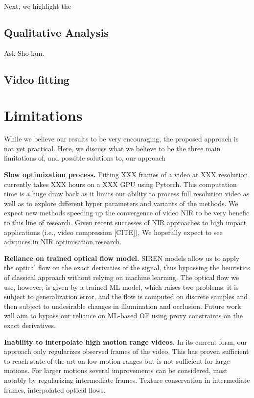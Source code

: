 \documentclass{article}
\begin{document}
Next, we highlight the



\subsection{Qualitative Analysis}

%
Ask Sho-kun.

\subsection{Video fitting}



\section{Limitations}

While we believe our results to be very encouraging, the proposed approach is not yet practical.
Here, we discuss what we believe to be the three main limitations of, and possible solutions to, our approach

\textbf{Slow optimization process.} Fitting XXX frames of a video at XXX resolution currently takes XXX hours on a XXX GPU using Pytorch.
This computation time is a huge draw back as it limits our ability to process full resolution video as well as
to explore different hyper parameters and variants of the methods.
We expect new methods speeding up the convergence of video NIR to be very benefic to this line of research.
Given recent successes of NIR approaches to high impact applications (i.e., video compression [CITE]),
We hopefully expect to see advances in NIR optimisation research.

\textbf{Reliance on trained optical flow model.}
SIREN models allow us to apply the optical flow on the exact derivaties of the signal,
thus bypassing the heuristics of classical approach without relying on machine learning.
The optical flow we use, however, is given by a trained ML model, which raises two problems:
it is subject to generalization error, and the flow is computed on discrete samples and then subject to
undesirable changes in illumination and occlusion.
Future work will aim to bypass our reliance on ML-based OF using proxy constraints on the exact derivatives.

\textbf{Inability to interpolate high motion range videos.}
In its current form, our approach only regularizes observed frames of the video.
This has proven sufficient to reach state-of-the art on low motion ranges but is not sufficient for large motions.
For larger motions several improvements can be considered, most notably by regularizing intermediate frames.
Texture conservation in intermediate frames, interpolated optical flows.
\end{document}
